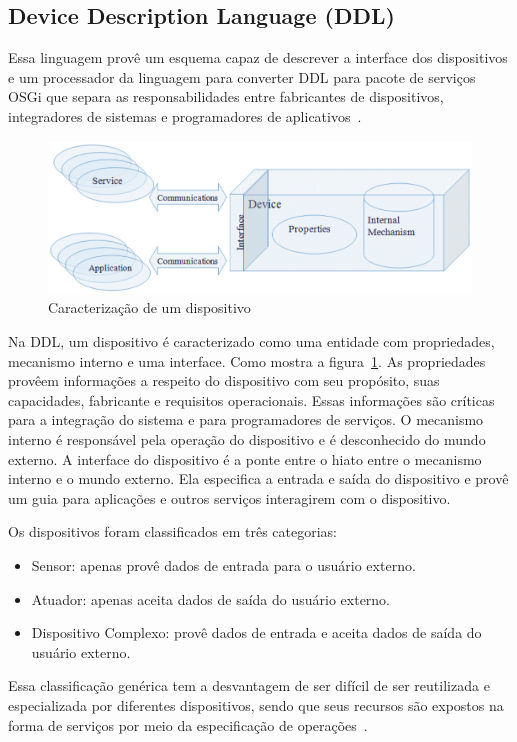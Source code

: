 \subsection{Device Description Language (DDL)}
\label{subsec:ddl}

Essa linguagem provê um esquema capaz de descrever a interface dos dispositivos e um processador da linguagem para converter DDL para pacote de serviços OSGi que separa as responsabilidades entre fabricantes de dispositivos, integradores de sistemas e programadores de aplicativos~\cite{gatorTechDDL}.

\begin{figure}[ht]
\center
\includegraphics[scale=0.4]{imagens/gatorDDL}
\caption{Caracterização de um dispositivo~\cite{ddlSpec}}
\label{fig:ddlspec}
\end{figure}

Na DDL, um dispositivo é caracterizado como uma entidade com propriedades, mecanismo interno e uma interface. Como mostra a figura~\ref{fig:ddlspec}. As propriedades provêem informações a respeito do dispositivo com seu propósito, suas capacidades, fabricante e requisitos operacionais. Essas informações são críticas para a integração do sistema e para programadores de serviços. O mecanismo interno é responsável pela operação do dispositivo e é desconhecido do mundo externo. A interface do dispositivo é a ponte entre o hiato entre o mecanismo interno e o mundo externo. Ela especifica a entrada e saída do dispositivo e provê um guia para aplicações e outros serviços interagirem com o dispositivo.

Os dispositivos foram classificados em três categorias:
\begin{itemize}
	\item Sensor: apenas provê dados de entrada para o usuário externo.
	\item Atuador: apenas aceita dados de saída do usuário externo.
	\item Dispositivo Complexo: provê dados de entrada e aceita dados de saída do usuário externo.
\end{itemize}

Essa classificação genérica tem a desvantagem de ser difícil de ser reutilizada e especializada por diferentes dispositivos, sendo que seus recursos são expostos na forma de serviços por meio da especificação de operações~\cite{ddlSpec}.
